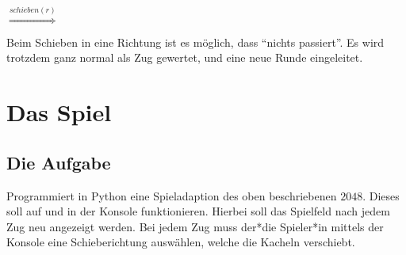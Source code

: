 \begin{center}
    $\stackrel{schieben(r)}{\Longrightarrow}$
\end{center}

Beim Schieben in eine Richtung ist es möglich, dass \enquote{nichts passiert}.
Es wird trotzdem ganz normal als Zug gewertet, und eine neue Runde eingeleitet.


\section*{Das Spiel}
\subsection*{Die Aufgabe}
Programmiert in Python eine Spieladaption des oben beschriebenen $2048$.
Dieses soll auf und in der Konsole funktionieren.
Hierbei soll das Spielfeld nach jedem Zug neu angezeigt werden.
Bei jedem Zug muss der*die Spieler*in mittels der Konsole eine Schieberichtung auswählen, welche die Kacheln verschiebt.

